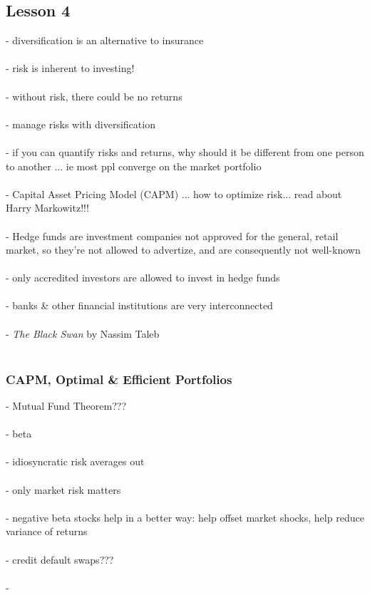 \documentclass{article} %
\begin{document}
	\subsection*{Lesson 4}
		- diversification is an alternative to insurance \\
		\\
		- risk is inherent to investing! \\
		\\
		- without risk, there could be no returns \\
		\\
		- manage risks with diversification \\
		\\
		- if you can quantify risks and returns, why should it be different from one person to another ... ie most ppl converge on the market portfolio \\
		\\
		- Capital Asset Pricing Model (CAPM) ... how to optimize risk... read about Harry Markowitz!!! \\
		\\
		- Hedge funds are investment companies not approved for the general, retail market, so they're not allowed to advertize, and are consequently not well-known \\
		\\
		- only accredited investors are allowed to invest in hedge funds \\
		\\	
		- banks \& other financial institutions are very interconnected \\
		\\
		- \textit{The Black Swan} by Nassim Taleb \\
		\\
			\subsubsection*{CAPM, Optimal \& Efficient Portfolios}
			- Mutual Fund Theorem??? \\
			\\
			- beta \\
			\\
			- idiosyncratic risk averages out \\
			\\
			- only market risk matters \\
			\\
			- negative beta stocks help in a better way: help offset market shocks, help reduce variance of returns\\
			\\
			- credit default swaps??? \\
			\\
			- 
\end{document}
